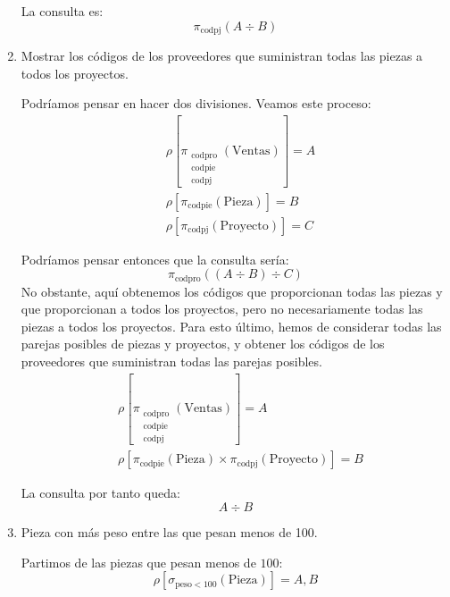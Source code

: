 \begin{ejercicio}
\begin{enumerate}
        La consulta es:
        \begin{equation*}
            \pi_{\text{codpj}}(A\div B)
        \end{equation*}
        \item Mostrar los códigos de los proveedores que suministran todas las piezas a todos los proyectos.
        
        Podríamos pensar en hacer dos divisiones. Veamos este proceso:
        \begin{align*}
            &\rho\left[\pi_{\substack{\text{codpro}\\\text{codpie}\\\text{codpj}}}\left(\text{Ventas}\right)\right]=A\\
            &\rho\left[\pi_{\text{codpie}}(\text{Pieza})\right]=B\\
            &\rho\left[\pi_{\text{codpj}}(\text{Proyecto})\right]=C
        \end{align*}

        Podríamos pensar entonces que la consulta sería:
        \begin{equation*}
            \pi_{\text{codpro}}((A\div B)\div C)
        \end{equation*}
        No obstante, aquí obtenemos los códigos que proporcionan todas las piezas y que proporcionan a todos los proyectos, pero no necesariamente todas las piezas a todos los proyectos.
        Para esto último, hemos de considerar todas las parejas posibles de piezas y proyectos, y obtener los códigos de los proveedores que suministran todas las parejas posibles.
        \begin{align*}
            &\rho\left[\pi_{\substack{\text{codpro}\\\text{codpie}\\\text{codpj}}}\left(\text{Ventas}\right)\right]=A\\
            &\rho\left[\pi_{\text{codpie}}(\text{Pieza})\times \pi_{\text{codpj}}(\text{Proyecto})\right]=B
        \end{align*}

        La consulta por tanto queda:
        \begin{equation*}
            A\div B
        \end{equation*}
        \item Pieza con más peso entre las que pesan menos de 100.
        
        Partimos de las piezas que pesan menos de $100$:
        \begin{equation*}
            \rho\left[\sigma_{\text{peso}<100}(\text{Pieza})\right]=A,B
        \end{equation*}


\end{enumerate}
\end{ejercicio}
